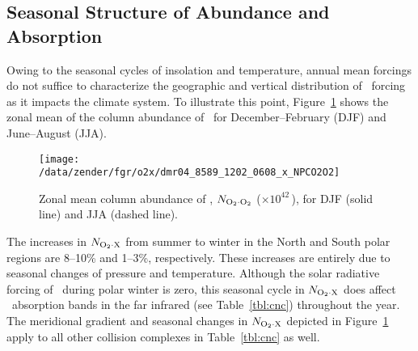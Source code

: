 \documentclass[agupp,twoside]{aguplus} %
\newlength{\fltwdtsngclm}\setlength{\fltwdtsngclm}{20.0pc} %
\begin{document}
\subsection{Seasonal Structure of Abundance and Absorption}\label{sxn:csn}  
Owing to the seasonal cycles of insolation and temperature, 
annual mean forcings do not suffice to characterize the
geographic and vertical distribution of \OdX\ forcing as it impacts
the climate system. 
To illustrate this point, Figure~\ref{fgr:NPCO2O2_x} shows the zonal
mean of the column abundance of \OdOd\ for December--February (DJF)
and June--August (JJA). 
\begin{figure}
\begin{center}
\texttt{[image: /data/zender/fgr/o2x/dmr04\_8589\_1202\_0608\_x\_NPCO2O2]}\vfill
\end{center}
\caption{
Zonal mean column abundance of \OdOd, $N_{\mathrm{O}_{2} \cdot \mathrm{O}_{2}}$ ($\times
10^{42}$\,\mlcSxcmF), for DJF (solid line) and JJA (dashed line).   
\label{fgr:NPCO2O2_x}}
\end{figure}
The increases in $N_{\mathrm{O}_{2} \cdot \mathrm{X}}$ from summer to winter in the North and
South polar regions are 8--10\% and 1--3\%, respectively. 
These increases are entirely due to seasonal changes of pressure and
temperature.  
Although the solar radiative forcing of \OdX\ during polar winter is
zero, this seasonal cycle in $N_{\mathrm{O}_{2} \cdot \mathrm{X}}$ does affect \OdX\ absorption
bands in the far infrared (see Table~\ref{tbl:cnc}) throughout the
year. 
The meridional gradient and seasonal changes in $N_{\mathrm{O}_{2} \cdot \mathrm{X}}$ depicted in
Figure~\ref{fgr:NPCO2O2_x} apply to all other collision complexes in
Table~\ref{tbl:cnc} as well. 
\end{document}
